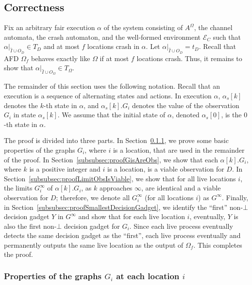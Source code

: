 \documentclass[11pt]{article}
\numberwithin{theorem}{section}
\begin{document}
\subsection{Correctness}
\label{subsec:omegaExtractionCorrectness}



Fix an arbitrary fair execution $\alpha$ of the system consisting of
$A^\Omega$, the channel automata, the crash automaton, and the
well-formed environment $\mathcal{E}_C$ such that $\alpha|_{\hat{I}
  \cup O_D} \in T_D$ and at most $f$ locations crash in $\alpha$. Let
$\alpha|_{\hat{I} \cup O_D} = t_D$. Recall that AFD $\Omega_f$ behaves
exactly like $\Omega$ if at most $f$ locations crash.
Thus, it remains to show that $\alpha|_{\hat{I} \cup O_{\Omega}} \in T_{\Omega}$.
 
 
 The remainder of this section uses the following notation. Recall
 that an execution is a sequence of alternating states and actions. In
 execution $\alpha$, $\alpha_s[k]$ denotes the $k$-th state in
 $\alpha$, and $\alpha_s[k].G_i$ denotes the value of the observation
 $G_i$ in state $\alpha_s[k]$. We assume that the initial state of $\alpha$, denoted $\alpha_s[0]$, is the $0$-th state in $\alpha$.
 
 The proof is divided into three parts. 
In Section~\ref{subsubsec:proofPartOne}, we prove some basic properties of
the graphs $G_i$, where $i$ is a location, that are used in the
remainder of the proof. 
In Section~\ref{subsubsec:proofGisAreObs}, we show that each
$\alpha[k].G_i$, where $k$ is a positive integer and $i$ is a
location, is a viable observation for $D$.
In Section~\ref{subsubsec:proofLimitObsIsViable}, we show that for all
live locations $i$, the limits $G^\infty_i$ of $\alpha[k].G_i$, as $k$
approaches $\infty$, are identical and a viable observation for
$D$; therefore, we denote all $G^\infty_i$ (for all locations $i$) as $G^\infty$. 
Finally, in Section~\ref{subsubsec:proofSmallestDecisionGadget}, we
identify the ``first'' non-$\bot$ decision gadget $Y$ in $G^\infty$ and show that
for each live location $i$, eventually, $Y$ is also the first
non-$\bot$ decision gadget for $G_i$. 
Since each live process eventually detects the same decision gadget as
the ``first'', each live process eventually and permanently outputs
the same live location as the output of
$\Omega_f$. This completes the proof. 
  
\subsubsection{Properties of the graphs $G_i$ at each location $i$}
\label{subsubsec:proofPartOne}
\end{document}
